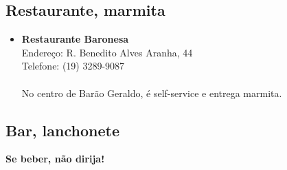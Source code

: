 \subsection{Restaurante, marmita}

\begin{itemize}
\item \textbf{Restaurante Baronesa}
  \\Endereço: R. Benedito Alves Aranha, 44
  \\Telefone: (19) 3289-9087
  \\
  \\No centro de Barão Geraldo, é self-service e entrega marmita.
\end{itemize}

\subsection{Bar, lanchonete}

\textbf{Se beber, não dirija!}

